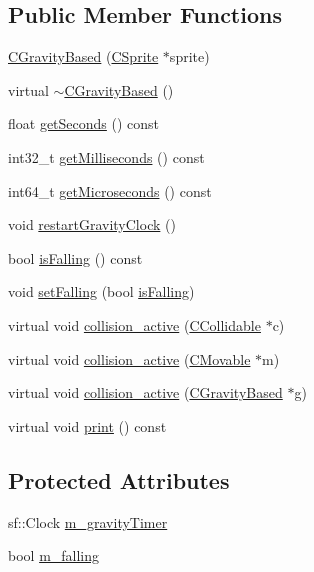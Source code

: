 \subsection*{Public Member Functions}
\begin{DoxyCompactItemize}
\item 
\hyperlink{classengine_1_1CGravityBased_a30378d0b24aa6313d12dc80d73492ca8}{C\-Gravity\-Based} (\hyperlink{classCSprite}{C\-Sprite} $\ast$sprite)
\item 
virtual \hyperlink{classengine_1_1CGravityBased_ad29312b47a2cb90d704b0557287c463c}{$\sim$\-C\-Gravity\-Based} ()
\item 
float \hyperlink{classengine_1_1CGravityBased_a723ff2142db951f2de1936b895e4037b}{get\-Seconds} () const 
\item 
int32\-\_\-t \hyperlink{classengine_1_1CGravityBased_a3b08ec9890633769718987a88a80ef83}{get\-Milliseconds} () const 
\item 
int64\-\_\-t \hyperlink{classengine_1_1CGravityBased_ae8168fa3497abc6a1a6fd06124b751e5}{get\-Microseconds} () const 
\item 
void \hyperlink{classengine_1_1CGravityBased_a43969612f1a106a54fd225e88bb6dd73}{restart\-Gravity\-Clock} ()
\item 
bool \hyperlink{classengine_1_1CGravityBased_aafff7dd45619ea9a948b266e364de4d8}{is\-Falling} () const 
\item 
void \hyperlink{classengine_1_1CGravityBased_aaaa791268b4c455f6137a3319473bf3c}{set\-Falling} (bool \hyperlink{classengine_1_1CGravityBased_aafff7dd45619ea9a948b266e364de4d8}{is\-Falling})
\item 
virtual void \hyperlink{classengine_1_1CGravityBased_aedf5cefc210d802cd219366b30ced9f8}{collision\-\_\-active} (\hyperlink{classengine_1_1CCollidable}{C\-Collidable} $\ast$c)
\item 
virtual void \hyperlink{classengine_1_1CGravityBased_a47f5f1081f356b4941401e0648a2a3f9}{collision\-\_\-active} (\hyperlink{classengine_1_1CMovable}{C\-Movable} $\ast$m)
\item 
virtual void \hyperlink{classengine_1_1CGravityBased_ac04bb2389041ba872a22cd575ae52dd6}{collision\-\_\-active} (\hyperlink{classengine_1_1CGravityBased}{C\-Gravity\-Based} $\ast$g)
\item 
virtual void \hyperlink{classengine_1_1CGravityBased_a1fd898d6529eeb9bb8651d7d9bcdb89c}{print} () const 
\end{DoxyCompactItemize}
\subsection*{Protected Attributes}
\begin{DoxyCompactItemize}
\item 
sf\-::\-Clock \hyperlink{classengine_1_1CGravityBased_a124ef300a1b855b6b508bdfede4fca39}{m\-\_\-gravity\-Timer}
\item 
bool \hyperlink{classengine_1_1CGravityBased_a25ea6b058b1c266b9307434bd0446828}{m\-\_\-falling}
\end{DoxyCompactItemize}


